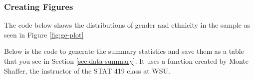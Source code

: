 \documentclass[]{article}
\newenvironment{Shaded}{\begin{snugshade}}{\end{snugshade}}
\newcommand{\AttributeTok}[1]{\textcolor[rgb]{0.77,0.63,0.00}{#1}}
\newcommand{\ConstantTok}[1]{\textcolor[rgb]{0.00,0.00,0.00}{#1}}
\newcommand{\FunctionTok}[1]{\textcolor[rgb]{0.00,0.00,0.00}{#1}}
\newcommand{\NormalTok}[1]{#1}
\newcommand{\SpecialCharTok}[1]{\textcolor[rgb]{0.00,0.00,0.00}{#1}}
\newcommand{\StringTok}[1]{\textcolor[rgb]{0.31,0.60,0.02}{#1}}
\begin{document}
\subsubsection{Creating Figures}
\label{sec:appendix-create-figures}

The code below shows the distributions of gender and ethnicity in the
sample as seen in Figure \ref{fig:ge-plot}

\begin{Shaded}
\end{Shaded}

Below is the code to generate the summary statistics and save them as a
table that you see in Section \ref{sec:data-summary}. It uses a function
created by Monte Shaffer, the instructor of the STAT 419 class at WSU.
\end{document}
